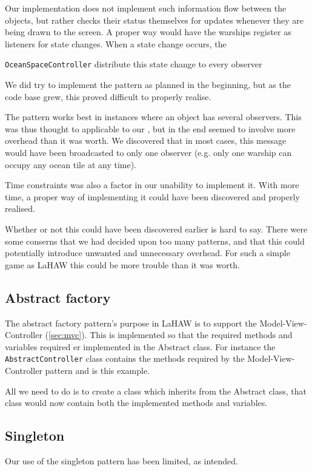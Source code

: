 Our implementation does not implement such information flow between the objects, but rather checks their status themselves for updates whenever they are being drawn to the screen.
A proper way would have the warships register as listeners for state changes. When a state change occurs, the 

\texttt{OceanSpaceController} distribute this state change to every observer

We did try to implement the pattern as planned in the beginning, but as the code base grew, this proved difficult to properly realise.

The pattern works best in instances where an object has several observers. This was thus thought to applicable to our 
, but in the end seemed to involve more overhead than it was worth. We discovered that in most cases, this message would have been broadcasted to only one observer (e.g. only one warship can occupy any ocean tile at any time).

Time constraints was also a factor in our unability to implement it. With more time, a proper way of implementing it could have been discovered and properly realised.

Whether or not this could have been discovered earlier is hard to say. There were some conserns that we had decided upon too many patterns, and that this could potentially introduce unwanted and unnecessary overhead. For such a simple game as LaHAW this could be more trouble than it was worth.



\subsection{Abstract factory}
\label{sec:absfac}
The abstract factory pattern's purpose in LaHAW is to support the Model-View-Controller (\ref{sec:mvc}). This is implemented so that the required methods and variables required er implemented in the Abstract class. For instance the \texttt{AbstractController} class contains the methods required by the Model-View-Controller pattern and is this example.

All we need to do is to create a class which inherits from the Abstract class, that class would now contain both the implemented methods and variables.

\subsection{Singleton}
Our use of the singleton pattern has been limited, as intended.

